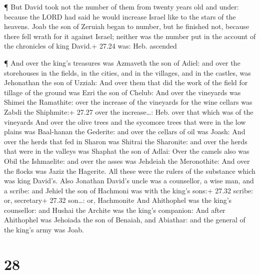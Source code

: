  ¶ But David took not the number of them from twenty years
old and under: because the LORD had said he would increase Israel like
to the stars of the heavens.  Joab the son of Zeruiah began
to number, but he finished not, because there fell wrath for it against
Israel; neither was the number put in the account of the chronicles of
king David.+ 27.24 was: Heb. ascended

 ¶ And over the king's treasures was Azmaveth the son of
Adiel: and over the storehouses in the fields, in the cities, and in the
villages, and in the castles, was Jehonathan the son of Uzziah:
 And over them that did the work of the field for tillage
of the ground was Ezri the son of Chelub:  And over the
vineyards was Shimei the Ramathite: over the increase of the vineyards
for the wine cellars was Zabdi the Shiphmite:+ 27.27 over the
increase\ldots: Heb. over that which was of the vineyards 
And over the olive trees and the sycomore trees that were in the low
plains was Baal-hanan the Gederite: and over the cellars of oil was
Joash:  And over the herds that fed in Sharon was Shitrai
the Sharonite: and over the herds that were in the valleys was Shaphat
the son of Adlai:  Over the camels also was Obil the
Ishmaelite: and over the asses was Jehdeiah the Meronothite:
 And over the flocks was Jaziz the Hagerite. All these were
the rulers of the substance which was king David's.  Also
Jonathan David's uncle was a counsellor, a wise man, and a scribe: and
Jehiel the son of Hachmoni was with the king's sons:+ 27.32 scribe: or,
secretary+ 27.32 son\ldots: or, Hachmonite  And Ahithophel
was the king's counsellor: and Hushai the Archite was the king's
companion:  And after Ahithophel was Jehoiada the son of
Benaiah, and Abiathar: and the general of the king's army was Joab.

\hypertarget{section-27}{%
\section{28}\label{section-27}}


